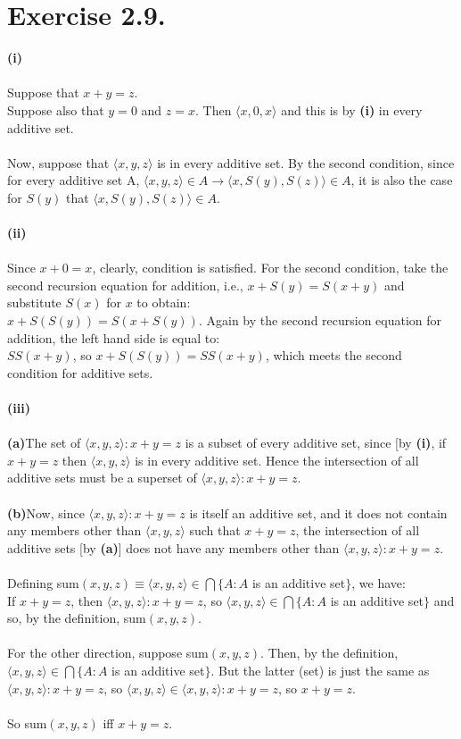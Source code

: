\documentclass{article}
\begin{document}
\section*{Exercise 2.9.}
\textbf{\large(i)}\\\\
Suppose that $x + y = z$.\\
Suppose also that $y=0$ and $z=x$. Then $\langle x, 0, x\rangle$ and this is by \textbf{\large(i)} in every additive set.\\\\ 
Now, suppose that $\langle x, y, z \rangle$ is in every additive set. By the second condition, since for every additive set A, $\langle x, y, z \rangle \in A \rightarrow \langle x, S(y), S(z) \rangle \in A$, it is also the case for $S(y)$ that $\langle x, S(y), S(z) \rangle \in A$. \\\\
\textbf{\large(ii)}\\\\
Since  $x+0=x$, clearly, condition is satisfied. For the second condition, take the second recursion equation for addition, i.e., $x+S(y)=S(x+y)$ and substitute $S(x)$ for $x$ to obtain:\\
$x+S(S(y))=S(x+S(y)).$ Again by the second recursion equation for addition, the left hand side is equal to:\\
$SS(x+y)$, \quad so $x+S(S(y))=SS(x+y)$, which meets the second condition for additive sets.
\\\\
\textbf{\large(iii)}\\\\
\textbf{(a)}The set of $\langle x, y, z \rangle : x+y=z$ is a subset of every additive set, since [by \textbf{\large(i)}, if $x+y=z$ then $\langle x, y, z \rangle$ is in every additive set. Hence the intersection of all additive sets must be a superset of $\langle x, y, z \rangle : x+y=z$.\\\\
\textbf{(b)}Now, since $\langle x, y, z \rangle : x+y=z$ is itself an additive set, and it does not contain any members other than $\langle x, y, z \rangle$ such that $x+y=z$, the intersection of all additive sets [by \textbf{(a)}] does not have any members other than $\langle x, y, z \rangle : x+y=z$.\\\\
Defining sum$(x,y,z)\equiv \langle x, y, z \rangle \in \bigcap \{A: A $ is an additive set$\}$, we have:\\
If $x + y = z$, then $\langle x, y, z \rangle : x+y=z$, so $\langle x, y, z \rangle \in \bigcap \{A: A $ is an additive set$\}$ and so, by the definition, \quad sum$(x,y,z)$.\\\\
For the other direction, suppose sum$(x,y,z)$. Then, by the definition,$\langle x, y, z \rangle \in \bigcap \{A: A $ is an additive set$\}$. But the latter (set) is just the same as $\langle x, y, z \rangle : x+y=z$, so $\langle x, y, z \rangle \in \langle x, y, z \rangle : x+y=z$, so $x+y=z$.\\\\
So sum$(x,y,z)$ iff $x+y=z$.
\end{document}

